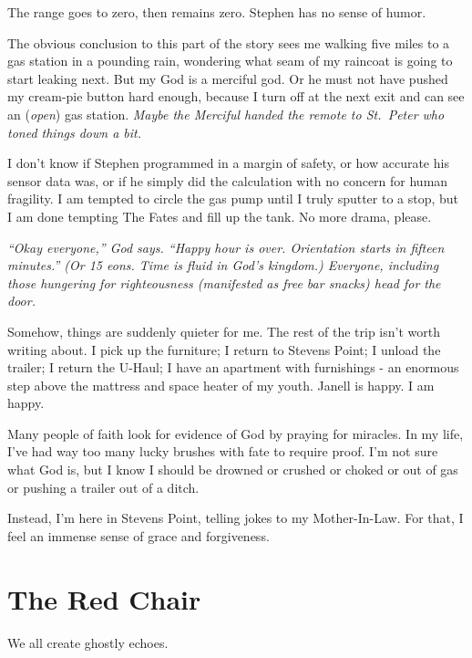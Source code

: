 \documentclass[
  letterpaper,
  DIV=11,
  numbers=noendperiod]{scrreprt}
\begin{document}
The range goes to zero, then remains zero. Stephen has no sense of
humor.

The obvious conclusion to this part of the story sees me walking five
miles to a gas station in a pounding rain, wondering what seam of my
raincoat is going to start leaking next. But my God is a merciful god.
Or he must not have pushed my cream-pie button hard enough, because I
turn off at the next exit and can see an (\emph{open}) gas station.
\emph{Maybe the Merciful handed the remote to St.~Peter who toned things
down a bit.}

I don't know if Stephen programmed in a margin of safety, or how
accurate his sensor data was, or if he simply did the calculation with
no concern for human fragility. I am tempted to circle the gas pump
until I truly sputter to a stop, but I am done tempting The Fates and
fill up the tank. No more drama, please.

\emph{``Okay everyone,'' God says. ``Happy hour is over. Orientation
starts in fifteen minutes.'' (Or 15 eons. Time is fluid in God's
kingdom.) Everyone, including those hungering for righteousness
(manifested as free bar snacks) head for the door.}

Somehow, things are suddenly quieter for me. The rest of the trip isn't
worth writing about. I pick up the furniture; I return to Stevens Point;
I unload the trailer; I return the U-Haul; I have an apartment with
furnishings - an enormous step above the mattress and space heater of my
youth. Janell is happy. I am happy.

Many people of faith look for evidence of God by praying for miracles.
In my life, I've had way too many lucky brushes with fate to require
proof. I'm not sure what God is, but I know I should be drowned or
crushed or choked or out of gas or pushing a trailer out of a ditch.

Instead, I'm here in Stevens Point, telling jokes to my Mother-In-Law.
For that, I feel an immense sense of grace and forgiveness.


\chapter*{The Red Chair}\label{the-red-chair}


We all create ghostly echoes.
\end{document}

